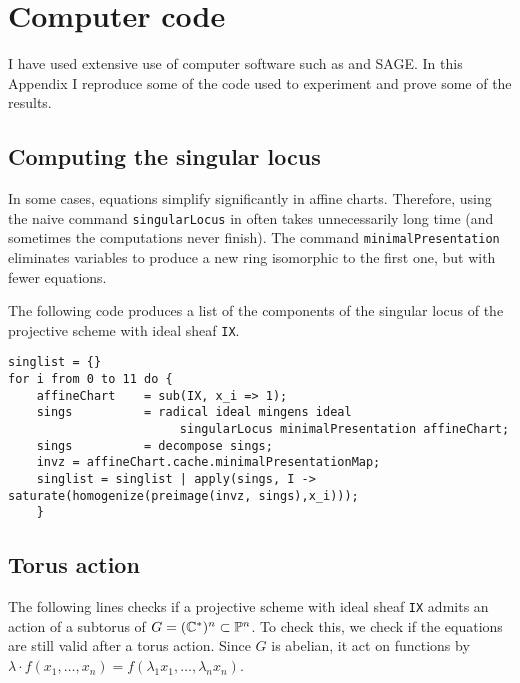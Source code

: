 \chapter{Computer code}
\label{sec:computercode}

I have used extensive use of computer software such as \MM and SAGE. In this Appendix I reproduce some of the code used to experiment and prove some of the results.

\section{Computing the singular locus}

In some cases, equations simplify significantly in affine charts. Therefore, using the naive command \texttt{singularLocus} in \MM often takes unnecessarily long time (and sometimes the computations never finish). The command \texttt{minimalPresentation} eliminates variables to produce a new ring isomorphic to the first one, but with fewer equations.

The following code produces a list of the components of the singular locus of the projective scheme with ideal sheaf \texttt{IX}. 

\begin{verbatim}
singlist = {}
for i from 0 to 11 do {
    affineChart    = sub(IX, x_i => 1);
    sings 	       = radical ideal mingens ideal
    					singularLocus minimalPresentation affineChart;
    sings          = decompose sings;
    invz = affineChart.cache.minimalPresentationMap;
    singlist = singlist | apply(sings, I -> saturate(homogenize(preimage(invz, sings),x_i)));
    }
\end{verbatim}

\section{Torus action}

The following lines checks if a projective scheme with ideal sheaf \texttt{IX} admits an action of a subtorus of $G=(\mathbb{C}^\ast)^n \subset \mathbb{P}^n$. To check this, we check if the equations are still valid after a torus action. Since $G$ is abelian, it act on functions by $\lambda \cdot f(x_1,\ldots,x_n)=f(\lambda_1 x_1, \ldots, \lambda_n x_n)$. 


